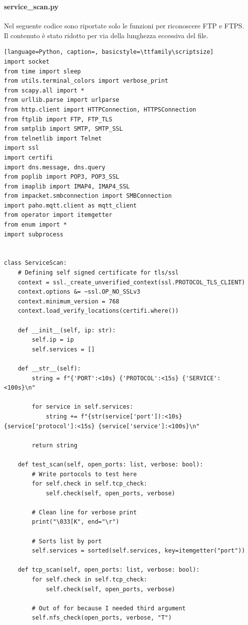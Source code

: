 \documentclass[12pt]{report}
\begin{document}
\newpage
\noindent
\textbf{service\_scan.py}
\\\\
Nel seguente codice sono riportate solo le funzioni per riconoscere FTP e FTPS. Il contenuto è stato ridotto per via della lunghezza eccessiva del file.
\begin{lstlisting}[language=Python, caption=, basicstyle=\ttfamily\scriptsize]
import socket
from time import sleep
from utils.terminal_colors import verbose_print
from scapy.all import *
from urllib.parse import urlparse
from http.client import HTTPConnection, HTTPSConnection
from ftplib import FTP, FTP_TLS
from smtplib import SMTP, SMTP_SSL
from telnetlib import Telnet
import ssl
import certifi
import dns.message, dns.query
from poplib import POP3, POP3_SSL
from imaplib import IMAP4, IMAP4_SSL
from impacket.smbconnection import SMBConnection
import paho.mqtt.client as mqtt_client
from operator import itemgetter
from enum import *
import subprocess


class ServiceScan:
    # Defining self signed certificate for tls/ssl
    context = ssl._create_unverified_context(ssl.PROTOCOL_TLS_CLIENT)
    context.options &= ~ssl.OP_NO_SSLv3
    context.minimum_version = 768
    context.load_verify_locations(certifi.where())

    def __init__(self, ip: str):
        self.ip = ip
        self.services = []

    def __str__(self):
        string = f"{'PORT':<10s} {'PROTOCOL':<15s} {'SERVICE':<100s}\n"

        for service in self.services:
            string += f"{str(service['port']):<10s} {service['protocol']:<15s} {service['service']:<100s}\n"

        return string

    def test_scan(self, open_ports: list, verbose: bool):
        # Write portocols to test here
        for self.check in self.tcp_check:
            self.check(self, open_ports, verbose)

        # Clean line for verbose print
        print("\033[K", end="\r")

        # Sorts list by port
        self.services = sorted(self.services, key=itemgetter("port"))

    def tcp_scan(self, open_ports: list, verbose: bool):
        for self.check in self.tcp_check:
            self.check(self, open_ports, verbose)

        # Out of for because I needed third argument
        self.nfs_check(open_ports, verbose, "T")


\end{lstlisting}
\end{document}
